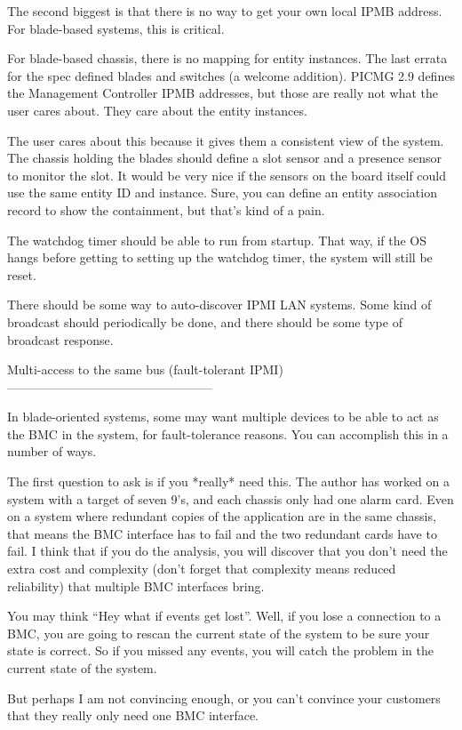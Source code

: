 The second biggest is that there is no way to get your own local IPMB
address.  For blade-based systems, this is critical.

For blade-based chassis, there is no mapping for entity instances.
The last errata for the spec defined blades and switches (a welcome
addition).  PICMG 2.9 defines the Management Controller IPMB
addresses, but those are really not what the user cares about.  They
care about the entity instances.

The user cares about this because it gives them a consistent view of
the system.  The chassis holding the blades should define a slot
sensor and a presence sensor to monitor the slot.  It would be very
nice if the sensors on the board itself could use the same entity ID
and instance.  Sure, you can define an entity association record to
show the containment, but that's kind of a pain.

The watchdog timer should be able to run from startup.  That way, if
the OS hangs before getting to setting up the watchdog timer, the
system will still be reset.

There should be some way to auto-discover IPMI LAN systems.  Some kind
of broadcast should periodically be done, and there should be some
type of broadcast response.


Multi-access to the same bus (fault-tolerant IPMI)
--------------------------------------------------

In blade-oriented systems, some may want multiple devices to be able
to act as the BMC in the system, for fault-tolerance reasons.  You can
accomplish this in a number of ways.

The first question to ask is if you *really* need this.  The author
has worked on a system with a target of seven 9's, and each chassis
only had one alarm card.  Even on a system where redundant copies of
the application are in the same chassis, that means the BMC interface
has to fail and the two redundant cards have to fail.  I think that if
you do the analysis, you will discover that you don't need the extra
cost and complexity (don't forget that complexity means reduced
reliability) that multiple BMC interfaces bring.

You may think ``Hey what if events get lost''.  Well, if you lose a
connection to a BMC, you are going to rescan the current state of the
system to be sure your state is correct.  So if you missed any events,
you will catch the problem in the current state of the system.

But perhaps I am not convincing enough, or you can't convince your
customers that they really only need one BMC interface.

